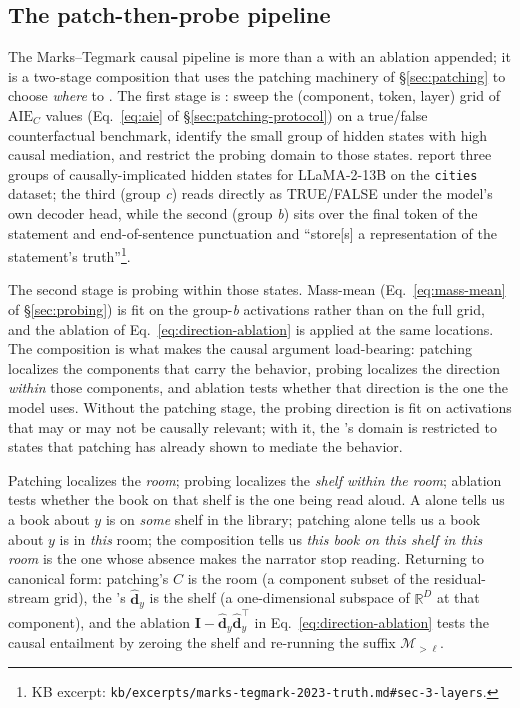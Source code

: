 \subsection{The patch-then-probe pipeline}
\label{sec:patch-then-probe}

The Marks--Tegmark causal pipeline is more than a  with an
ablation appended; it is a two-stage composition that uses the
patching machinery of \S\ref{sec:patching} to choose \emph{where} to
. The first stage is : sweep the
(component, token, layer) grid of $\mathrm{AIE}_C$ values
(Eq.~\ref{eq:aie} of \S\ref{sec:patching-protocol}) on a
true/false counterfactual benchmark, identify the small group of
hidden states with high causal mediation, and restrict the probing
domain to those states. \citet[\S 3]{marks-tegmark-2023-truth} report
three groups of causally-implicated hidden states for LLaMA-2-13B on
the \texttt{cities} dataset; the third (group \emph{c}) reads
directly as TRUE/FALSE under the model's own decoder head, while the
second (group \emph{b}) sits over the final token of the statement
and end-of-sentence punctuation and ``store[s] a representation of
the statement's truth''\footnote{KB excerpt:
\texttt{kb/excerpts/marks-tegmark-2023-truth.md\#sec-3-layers}.}.

The second stage is probing within those states. Mass-mean
(Eq.~\ref{eq:mass-mean} of \S\ref{sec:probing}) is fit on the
group-\emph{b} activations rather than on the full grid, and the
ablation of Eq.~\eqref{eq:direction-ablation} is applied at the same
locations. The composition is what makes the causal argument
load-bearing: patching localizes the components that carry the
behavior, probing localizes the direction \emph{within} those
components, and ablation tests whether that direction is the one the
model uses. Without the patching stage, the probing direction is
fit on activations that may or may not be causally relevant; with it,
the 's domain is restricted to states that patching has already
shown to mediate the behavior.

\begin{analogy}
Patching localizes the \emph{room}; probing localizes the \emph{shelf
within the room}; ablation tests whether the book on that shelf is
the one being read aloud. A  alone tells us a book about $y$ is
on \emph{some} shelf in the library; patching alone tells us a book
about $y$ is in \emph{this} room; the composition tells us \emph{this
book on this shelf in this room} is the one whose absence makes the
narrator stop reading. Returning to canonical form: patching's $C$ is
the room (a component subset of the residual-stream grid), the
's $\hat{\mathbf{d}}_y$ is the shelf (a one-dimensional
subspace of $\mathbb{R}^D$ at that component), and the ablation
$\mathbf{I} - \hat{\mathbf{d}}_y \hat{\mathbf{d}}_y^\top$ in
Eq.~\eqref{eq:direction-ablation} tests the causal entailment by
zeroing the shelf and re-running the suffix $\mathcal{M}_{>\ell}$.
\end{analogy}

